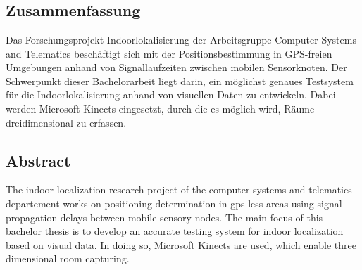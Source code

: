 \chapter*{\abstractname}
\section*{Zusammenfassung}
Das Forschungsprojekt Indoorlokalisierung der Arbeitsgruppe Computer Systems and Telematics beschäftigt sich mit der Positionsbestimmung in GPS-freien Umgebungen anhand von Signallaufzeiten zwischen mobilen Sensorknoten. Der Schwerpunkt dieser Bachelorarbeit liegt darin, ein möglichst genaues Testsystem für die Indoorlokalisierung anhand von visuellen Daten zu entwickeln. Dabei werden Microsoft Kinects eingesetzt, durch die es möglich wird, Räume dreidimensional zu erfassen.

\section*{Abstract}
The indoor localization research project of the computer systems and telematics departement works on positioning determination in gps-less areas using signal propagation delays between mobile sensory nodes. The main focus of this bachelor thesis is to develop an accurate testing system for indoor localization based on visual data. In doing so, Microsoft Kinects are used, which enable three dimensional room capturing.